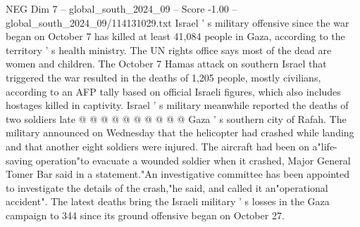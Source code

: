 \begin{textsample}{NEG Dim 7 – global\_south\_2024\_09 – Score -1.00 – global\_south\_2024\_09/114131029.txt}
Israel ' s military offensive since the war began on October 7 has killed at least 41,084 people in Gaza, according to the territory ' s health ministry.
The UN rights office says most of the dead are women and children.
The October 7 Hamas attack on southern Israel that triggered the war resulted in the deaths of 1,205 people, mostly civilians, according to an AFP tally based on official Israeli figures, which also includes hostages killed in captivity.
Israel ' s military meanwhile reported the deaths of two soldiers late @ @ @ @ @ @ @ @ @ @ Gaza ' s southern city of Rafah.
The military announced on Wednesday that the helicopter had crashed while landing and that another eight soldiers were injured.
The aircraft had been on a"life-saving operation"to evacuate a wounded soldier when it crashed, Major General Tomer Bar said in a statement."An investigative committee has been appointed to investigate the details of the crash,"he said, and called it an"operational accident".
The latest deaths bring the Israeli military ' s losses in the Gaza campaign to 344 since its ground offensive began on October 27.

\end{textsample}

